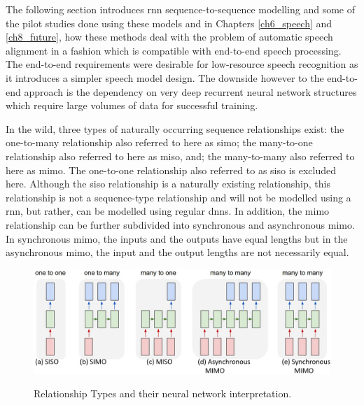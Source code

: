 The following section introduces \acrshort{rnn} sequence-to-sequence modelling and some of the pilot studies done using these models and in Chapters \ref{ch6_speech} and \ref{ch8_future}, how these methods deal with the problem of automatic speech alignment in a fashion which is compatible with end-to-end speech processing.  The end-to-end requirements were desirable for low-resource speech recognition as it introduces a simpler speech model design.  The downside however to the end-to-end approach is the dependency on very deep recurrent neural network structures which require large volumes of data for successful training.


In the wild, three types of naturally occurring sequence relationships exist: the one-to-many relationship also referred to here as \acrfull{simo}; the many-to-one relationship also referred to here as \acrfull{miso}, and; the many-to-many also referred to here as \acrfull{mimo}.  The one-to-one relationship also referred to as \acrfull{siso} is excluded here.  Although the \acrshort{siso} relationship is a naturally existing relationship, this relationship is not a sequence-type relationship and will not be modelled using a \acrlong{rnn}, but rather, can be modelled using regular \acrlong{dnn}s.  In addition, the \acrshort{mimo} relationship can be further subdivided into synchronous and asynchronous \acrshort{mimo}. In synchronous \acrshort{mimo}, the inputs and the outputs have equal lengths but in the asynchronous \acrshort{mimo}, the input and the output lengths are not necessarily equal.

\begin{figure}
\centering
  \includegraphics[width=14cm]{thesis/images/seq03.PNG}\\
  \caption{Relationship Types and their neural network interpretation.  \citep{karpathy2015unreasonable}}\label{fig_c3_seq2seq}
\end{figure}


